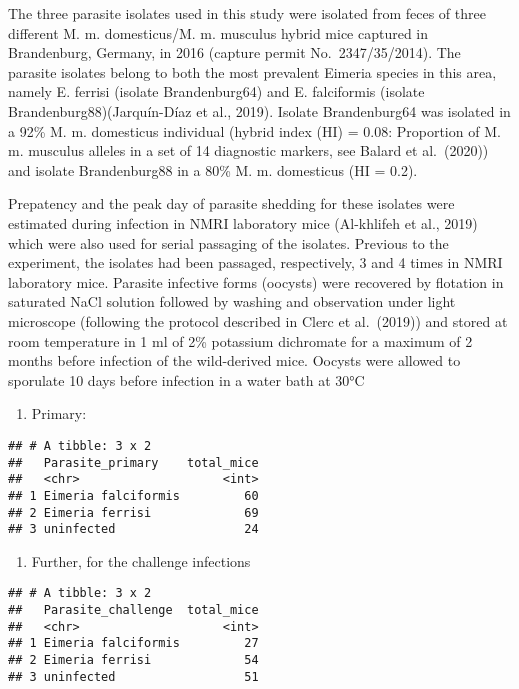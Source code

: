 \documentclass[
]{article}
\providecommand{\tightlist}{%
  \setlength{\itemsep}{0pt}\setlength{\parskip}{0pt}}
\begin{document}
The three parasite isolates used in this study were isolated from feces
of three different M. m. domesticus/M. m. musculus hybrid mice captured
in Brandenburg, Germany, in 2016 (capture permit No.~2347/35/2014). The
parasite isolates belong to both the most prevalent Eimeria species in
this area, namely E. ferrisi (isolate Brandenburg64) and E. falciformis
(isolate Brandenburg88)(Jarquín-Díaz et al., 2019). Isolate
Brandenburg64 was isolated in a 92\% M. m. domesticus individual (hybrid
index (HI) = 0.08: Proportion of M. m. musculus alleles in a set of 14
diagnostic markers, see Balard et al.~(2020)) and isolate Brandenburg88
in a 80\% M. m. domesticus (HI = 0.2).

Prepatency and the peak day of parasite shedding for these isolates were
estimated during infection in NMRI laboratory mice (Al-khlifeh et al.,
2019) which were also used for serial passaging of the isolates.
Previous to the experiment, the isolates had been passaged,
respectively, 3 and 4 times in NMRI laboratory mice. Parasite infective
forms (oocysts) were recovered by flotation in saturated NaCl solution
followed by washing and observation under light microscope (following
the protocol described in Clerc et al.~(2019)) and stored at room
temperature in 1 ml of 2\% potassium dichromate for a maximum of 2
months before infection of the wild-derived mice. Oocysts were allowed
to sporulate 10 days before infection in a water bath at 30°C

\begin{enumerate}
\def\labelenumi{\arabic{enumi}.}
\tightlist
\item
  Primary:
\end{enumerate}

\begin{verbatim}
## # A tibble: 3 x 2
##   Parasite_primary    total_mice
##   <chr>                    <int>
## 1 Eimeria falciformis         60
## 2 Eimeria ferrisi             69
## 3 uninfected                  24
\end{verbatim}

\begin{enumerate}
\def\labelenumi{\arabic{enumi}.}
\setcounter{enumi}{1}
\tightlist
\item
  Further, for the challenge infections
\end{enumerate}

\begin{verbatim}
## # A tibble: 3 x 2
##   Parasite_challenge  total_mice
##   <chr>                    <int>
## 1 Eimeria falciformis         27
## 2 Eimeria ferrisi             54
## 3 uninfected                  51
\end{verbatim}
\end{document}
